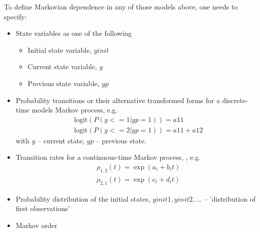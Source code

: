 To define Markovian dependence in any of those models above, one needs to specify:
\begin{itemize}
\item
State variables as one of the following
\begin{itemize}
\item
Initial state variable, $yinit$
\item
Current state variable, $y$
\item
Previous state variable, $yp$
\end{itemize}
\item
Probability transitions or their alternative transformed forms for a discrete-time models Markov process, e.g.
\begin{align}
& \text{logit}(P(y<=1 | yp=1)) = a11 \nonumber \\
& \text{logit}(P(y<=2 | yp=1)) = a11 + a12\nonumber
\end{align}
with $y$ -- current state, $yp$ -- previous state.
\item
Transition rates for a continuous-time Markov process, \cite{LavielleBook:2014}, e.g.
\begin{align}
& \rho_{1,2}(t) = \exp(a_i+b_i t)  \nonumber \\
& \rho_{2,1}(t) = \exp(c_i+d_i t) \nonumber 
\end{align}
\item
Probability distribution of the initial states, $yinit1, yinit2, ...$ -- 'distribution of first observations'
\item
Markov order
\end{itemize}

%
%


